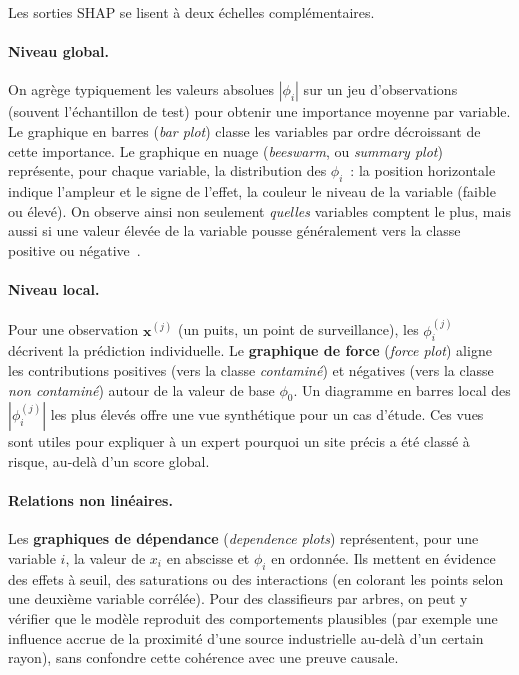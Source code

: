 \label{sec:shap-global-local}

Les sorties SHAP se lisent \`a deux \'echelles compl\'ementaires.

\paragraph{Niveau global.}
On agr\`ege typiquement les valeurs absolues $|\phi_i|$ sur un jeu d'observations (souvent l'\'echantillon de test) pour obtenir une importance moyenne par variable.
Le graphique en barres (\emph{bar plot}) classe les variables par ordre d\'ecroissant de cette importance.
Le graphique en nuage (\emph{beeswarm}, ou \emph{summary plot}) repr\'esente, pour chaque variable, la distribution des $\phi_i$~: la position horizontale indique l'ampleur et le signe de l'effet, la couleur le niveau de la variable (faible ou \'elev\'e).
On observe ainsi non seulement \emph{quelles} variables comptent le plus, mais aussi si une valeur \'elev\'ee de la variable pousse g\'en\'eralement vers la classe positive ou n\'egative~\cite{lundberg2017shap}.

\paragraph{Niveau local.}
Pour une observation $\mathbf{x}^{(j)}$ (un puits, un point de surveillance), les $\phi_i^{(j)}$ d\'ecrivent la pr\'ediction individuelle.
Le \textbf{graphique de force} (\emph{force plot}) aligne les contributions positives (vers la classe \emph{contamin\'e}) et n\'egatives (vers la classe \emph{non contamin\'e}) autour de la valeur de base $\phi_0$.
Un diagramme en barres local des $| \phi_i^{(j)} |$ les plus \'elev\'es offre une vue synth\'etique pour un cas d'\'etude.
Ces vues sont utiles pour expliquer \`a un expert pourquoi un site pr\'ecis a \'et\'e class\'e \`a risque, au-del\`a d'un score global.

\paragraph{Relations non lin\'eaires.}
Les \textbf{graphiques de d\'ependance} (\emph{dependence plots}) repr\'esentent, pour une variable $i$, la valeur de $x_i$ en abscisse et $\phi_i$ en ordonn\'ee.
Ils mettent en \'evidence des effets \`a seuil, des saturations ou des interactions (en colorant les points selon une deuxi\`eme variable corr\'el\'ee).
Pour des classifieurs par arbres, on peut y v\'erifier que le mod\`ele reproduit des comportements plausibles (par exemple une influence accrue de la proximit\'e d'une source industrielle au-del\`a d'un certain rayon), sans confondre cette coh\'erence avec une preuve causale.


